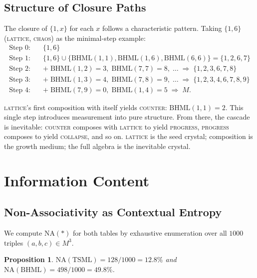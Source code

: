 \documentclass[11pt,a4paper]{article}
\newtheorem{proposition}[theorem]{Proposition}
\theoremstyle{definition}
\theoremstyle{remark}
\newcommand{\NA}{\mathrm{NA}}
\newcommand{\TSML}{\mathrm{TSML}}
\newcommand{\BHML}{\mathrm{BHML}}
\begin{document}
\subsection{Structure of Closure Paths}\label{sec:closure-paths}

The closure of $\{1,x\}$ for each $x$ follows a characteristic pattern. Taking $\{1,6\}$ (\textsc{lattice}, \textsc{chaos}) as the minimal-step example:
\begin{align*}
\text{Step 0:}\quad & \{1,6\}\\
\text{Step 1:}\quad & \{1,6\}\cup\{\BHML(1,1),\BHML(1,6),\BHML(6,6)\}
  = \{1,2,6,7\}\\
\text{Step 2:}\quad & +\;\BHML(1,2)=3,\;\BHML(7,7)=8,\;\ldots
  \;\Longrightarrow\; \{1,2,3,6,7,8\}\\
\text{Step 3:}\quad & +\;\BHML(1,3)=4,\;\BHML(7,8)=9,\;\ldots
  \;\Longrightarrow\; \{1,2,3,4,6,7,8,9\}\\
\text{Step 4:}\quad & +\;\BHML(7,9)=0,\;\BHML(1,4)=5
  \;\Longrightarrow\; M.
\end{align*}

\textsc{lattice}'s first composition with itself yields \textsc{counter}: $\BHML(1,1)=2$. This single step introduces measurement into pure structure. From there, the cascade is inevitable: \textsc{counter} composes with \textsc{lattice} to yield \textsc{progress}, \textsc{progress} composes to yield \textsc{collapse}, and so on. \textsc{lattice} is the seed crystal; composition is the growth medium; the full algebra is the inevitable crystal.

\section{Information Content}\label{sec:info}

\subsection{Non-Associativity as Contextual Entropy}\label{sec:na-entropy}

We compute $\NA(\ast)$ for both tables by exhaustive enumeration over all $1000$ triples $(a,b,c)\in M^{3}$.

\begin{proposition}\label{prop:na-values}
$\NA(\TSML) = 128/1000 = 12.8\%$ and $\NA(\BHML) = 498/1000 = 49.8\%$.
\end{proposition}
\end{document}
